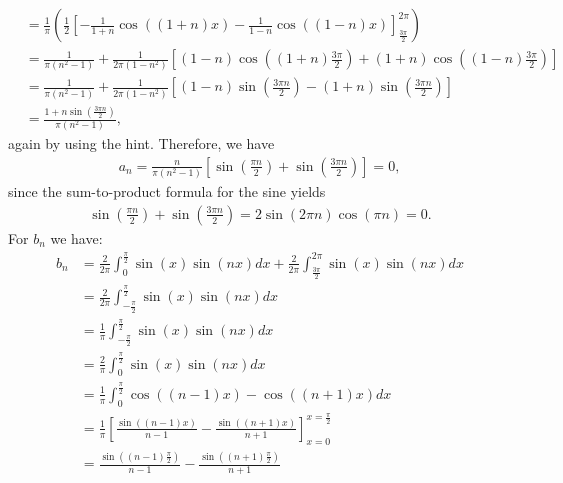 \documentclass[11pt]{article}
\begin{document}
\begin{solution}
\begin{itemize}
\begin{align*}
        &= \frac 1 \pi \left( \frac 1 2 \left[ -\frac 1 {1 + n} \cos((1 + n)x) - \frac 1 {1 - n} \cos((1 - n)x) \right]_{\frac {3 \pi} 2}^{2 \pi} \right)\\
        &= \frac{1}{\pi(n^2 - 1)} + \frac{1}{2 \pi (1 - n^2)} \left[ (1 - n) \cos\left((1 + n)\frac{3 \pi}{2}\right) + (1 + n) \cos\left((1 - n) \frac{3 \pi}{2}\right)\right]\\
        &= \frac{1}{\pi(n^2 - 1)} + \frac{1}{2 \pi (1 - n^2)} \left[(1-n) \sin\left(\frac{3 \pi n}{2}\right) - (1 + n) \sin\left(\frac{3 \pi n}{2}\right)\right]\\
        &= \frac{1 + n \sin\left( \frac{3 \pi n}{2}\right)}{\pi(n^2 - 1)},
    \end{align*}
    again by using the hint. Therefore, we have
    \begin{align*}
        a_n = \frac{n}{\pi (n^2 - 1)} \left[ \sin\left( \frac{\pi n}{2}\right)  + \sin\left( \frac{3 \pi n}{2}\right)\right] = 0,
    \end{align*}
    since the sum-to-product formula for the sine yields
    \begin{align*}
        \sin\left( \frac{\pi n}{2}\right)  + \sin\left( \frac{3 \pi n}{2}\right) = 2 \sin\left(2 \pi n \right) \cos\left (\pi n \right) = 0.
    \end{align*}
    For $b_n$ we have:
    \begin{align*}
        b_n 
        &
        = 
        \frac{2}{2\pi}
        \int_{0}^{\frac{\pi}{2}} \sin(x) \sin(n x) dx
        +
        \frac{2}{2\pi}
        \int_{\frac{3\pi}{2}}^{2\pi} \sin(x) \sin(n x) dx
        \\&
        =
        \frac{2}{2\pi}
        \int_{-\frac{\pi}{2}}^{\frac{\pi}{2}} \sin(x) \sin(n x) dx
        \\&
        =
        \frac{1}{\pi}
        \int_{-\frac{\pi}{2}}^{\frac{\pi}{2}} \sin(x) \sin(n x) dx
        \\&
        =
        \frac{2}{\pi}
        \int_{0}^{\frac{\pi}{2}} \sin(x) \sin(n x) dx
        \\&
        =
        \frac{1}{\pi}
        \int_{0}^{\frac{\pi}{2}} \cos((n-1)x) - \cos((n+1)x) dx
        \\&
        =
        \frac{1}{\pi}
        \left[ \frac{\sin((n-1)x)}{n-1} - \frac{\sin((n+1)x)}{n+1}\right]_{x=0}^{x=\frac{\pi}{2}}
        \\&
        =
        \frac{\sin((n-1)\frac{\pi}{2})}{n-1} - \frac{\sin((n+1)\frac{\pi}{2})}{n+1}
    \end{align*}

\end{itemize}
\end{solution}
\end{document}

